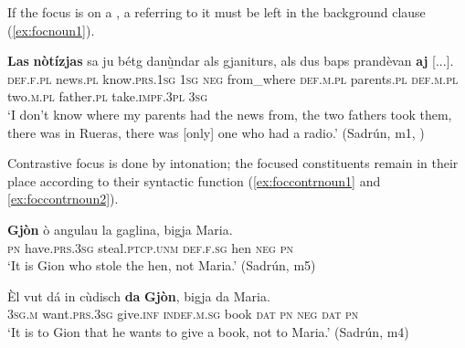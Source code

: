 If the focus is on a , a  referring to it must be left in the background clause (\ref{ex:focnoun1}).

\ea
\label{ex:focnoun1}
\gll  \textbf{Las} \textbf{nòtízjas} sa ju bétg danù̱ndar als gjaniturs, als dus baps prandèvan \textbf{aj} [...]. \\
\textsc{def.f.pl} news.\textsc{pl} know.\textsc{prs.1sg} \textsc{1sg} \textsc{neg} from\_where \textsc{def.m.pl} parents.\textsc{pl} \textsc{def.m.pl} two.\textsc{m.pl} father.\textsc{pl} take.\textsc{impf.3pl} \textsc{3sg}\\
\glt `I don’t know where my parents had the news from, the two fathers took them, there was in Rueras, there was [only] one who had a radio.' (Sadrún, m1, )
\z

Contrastive focus is done by intonation; the focused constituents remain in their place according to their syntactic function (\ref{ex:foccontrnoun1} and \ref{ex:foccontrnoun2}).

\ea
\label{ex:foccontrnoun1}
\gll \textbf{Gjòn} ò angulau la gaglina, bigja Maria.\\
\textsc{pn} have.\textsc{prs.3sg} steal.\textsc{ptcp.unm} \textsc{def.f.sg} hen \textsc{neg} \textsc{pn}\\
\glt `It is Gion who stole the hen, not Maria.' (Sadrún, m5)
\z

\ea
\label{ex:foccontrnoun2}
\gll Èl vut dá in cùdisch \textbf{da} \textbf{Gjòn}, bigja da Maria.\\
\textsc{3sg.m} want.\textsc{prs.3sg} give.\textsc{inf} \textsc{indef.m.sg} book \textsc{dat} \textsc{pn} \textsc{neg} \textsc{dat} \textsc{pn}\\
\glt `It is to Gion that he wants to give a book, not to Maria.' (Sadrún, m4)
\z







